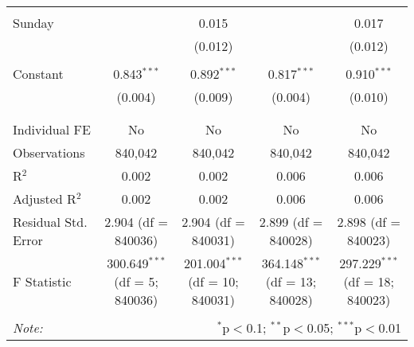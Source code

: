 \documentclass[
]{article}
\begin{document}
\begin{table}[!htbp]
{\begin{tabular}{@{\extracolsep{5pt}}lcccc}
  & & & & \\ 
 Sunday &  & 0.015 &  & 0.017 \\ 
  &  & (0.012) &  & (0.012) \\ 
  & & & & \\ 
 Constant & 0.843$^{***}$ & 0.892$^{***}$ & 0.817$^{***}$ & 0.910$^{***}$ \\ 
  & (0.004) & (0.009) & (0.004) & (0.010) \\ 
  & & & & \\ 
\hline \\[-1.8ex] 
Individual FE & No & No & No & No \\ 
Observations & 840,042 & 840,042 & 840,042 & 840,042 \\ 
R$^{2}$ & 0.002 & 0.002 & 0.006 & 0.006 \\ 
Adjusted R$^{2}$ & 0.002 & 0.002 & 0.006 & 0.006 \\ 
Residual Std. Error & 2.904 (df = 840036) & 2.904 (df = 840031) & 2.899 (df = 840028) & 2.898 (df = 840023) \\ 
F Statistic & 300.649$^{***}$ (df = 5; 840036) & 201.004$^{***}$ (df = 10; 840031) & 364.148$^{***}$ (df = 13; 840028) & 297.229$^{***}$ (df = 18; 840023) \\ 
\hline 
\hline \\[-1.8ex] 
\textit{Note:}  & \multicolumn{4}{r}{$^{*}$p$<$0.1; $^{**}$p$<$0.05; $^{***}$p$<$0.01} \\ 
\end{tabular}
} 
\end{table} 
\newpage
\end{document}
